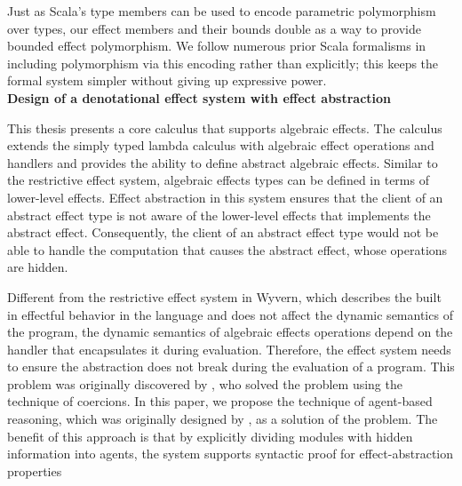  Just as Scala's type members can be used to encode parametric polymorphism over types, our effect members and their bounds double as a way to provide bounded effect polymorphism. We follow numerous prior Scala formalisms in including polymorphism via this encoding rather than explicitly; this keeps the formal system simpler without giving up expressive power. \\


\noindent\textbf{Design of a denotational effect system with effect abstraction}  

This thesis presents a core calculus that supports algebraic effects. The calculus extends the simply typed lambda calculus with algebraic effect operations and handlers and provides the ability to define abstract algebraic effects. Similar to the restrictive effect system, algebraic effects types can be defined in terms of lower-level effects. Effect abstraction in this system ensures that the client of an abstract effect type is not aware of the lower-level effects that implements the abstract effect. Consequently, the client of an abstract effect type would not be able to handle the computation that causes the abstract effect, whose operations are hidden.

Different from the restrictive effect system in Wyvern, which describes the built in effectful behavior in the language and does not affect the dynamic semantics of the program, the dynamic semantics of algebraic effects operations depend on the handler that encapsulates it during evaluation.  Therefore, the effect system needs to ensure the abstraction does not break during the evaluation of a program. This problem was originally discovered by \citet{biernacki19}, who solved the problem using the technique of coercions. In this paper, we propose the technique of agent-based reasoning, which was originally designed by \citet{grossman00}, as a solution of the problem. The benefit of this approach is that by explicitly dividing modules with hidden information into agents, the system supports syntactic proof for effect-abstraction properties \\

